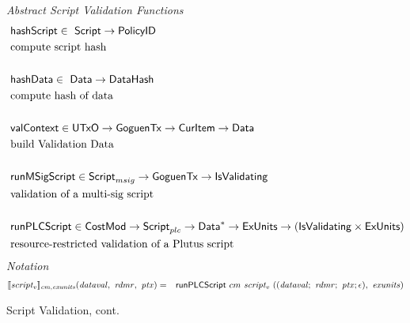 \begin{figure*}[htb]
  \emph{Abstract Script Validation Functions}
  \begin{align*}
     &\mathsf{hashScript} \in  ~\mathsf{Script}\to \mathsf{PolicyID} \\
     &\text{compute script hash} \\~\\
     &\mathsf{hashData} \in  ~\mathsf{Data} \to \mathsf{DataHash} \\
     &\text{compute hash of data} \\~\\
     &\mathsf{valContext} \in  \mathsf{UTxO} \to \mathsf{GoguenTx} \to \mathsf{CurItem} \to \mathsf{Data} \\
     &\text{build Validation Data} \\~\\
     &\mathsf{runMSigScript} \in\mathsf{Script}_{msig}\to \mathsf{GoguenTx} \to \mathsf{IsValidating}  \\
     &\text{validation of a multi-sig script} \\~\\
     &\mathsf{runPLCScript} \in \mathsf{CostMod} \to\mathsf{Script}_{plc} \to
    \mathsf{Data}^{*} \to \mathsf{ExUnits} \to (\mathsf{IsValidating} \times \mathsf{ExUnits}) \\
     &\text{resource-restricted validation of a Plutus script}
  \end{align*}
  \emph{Notation}
  \begin{align*}
    \llbracket \mathit{script_v} \rrbracket_{\mathit{cm},\mathit{exunits}}(\mathit{dataval},~\mathit{rdmr},~\mathit{ptx})
    &=& \mathsf{runPLCScript} ~{cm}~\mathit{script_v}~((\mathit{dataval};~\mathit{rdmr};~\mathit{ptx};\epsilon),~
    \mathit{exunits})
  \end{align*}
  \caption{Script Validation, cont.}
  \label{fig:defs:functions-valid}
\end{figure*}


\clearpage
